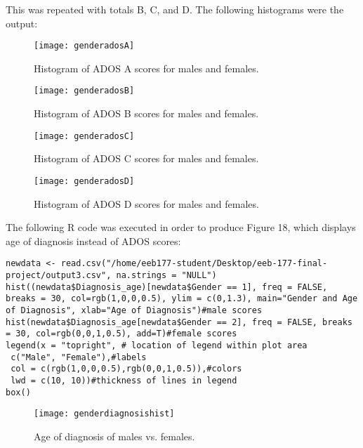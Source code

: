 \documentclass{article}
\begin{document}
This was repeated with totals B, C, and D. The following histograms were the output:
\begin{figure}[!htb]
  \centering
  \begin{minipage}[h!]{0.49\linewidth}
    \texttt{[image: genderadosA]}
    \caption{Histogram of ADOS A scores for males and females.}
  \end{minipage}
  \hfill
  \begin{minipage}[h!]{0.49\linewidth}
    \texttt{[image: genderadosB]}
    \caption{Histogram of ADOS B scores for males and females.}
  \end{minipage}
\end{figure}

\begin{figure}[!htb]
  \centering
  \begin{minipage}[h!]{0.49\linewidth}
    \texttt{[image: genderadosC]}
    \caption{Histogram of ADOS C scores for males and females.}
  \end{minipage}
  \hfill
  \begin{minipage}[h!]{0.49\linewidth}
    \texttt{[image: genderadosD]}
    \caption{Histogram of ADOS D scores for males and females.}
  \end{minipage}
\end{figure}

\newpage

The following R code was executed in order to produce Figure 18, which displays age of diagnosis instead of ADOS scores:

\begin{verbatim}
newdata <- read.csv("/home/eeb177-student/Desktop/eeb-177-final-project/output3.csv", na.strings = "NULL")
hist((newdata$Diagnosis_age)[newdata$Gender == 1], freq = FALSE, breaks = 30, col=rgb(1,0,0,0.5), ylim = c(0,1.3), main="Gender and Age of Diagnosis", xlab="Age of Diagnosis")#male scores
hist(newdata$Diagnosis_age[newdata$Gender == 2], freq = FALSE, breaks = 30, col=rgb(0,0,1,0.5), add=T)#female scores
legend(x = "topright", # location of legend within plot area
 c("Male", "Female"),#labels
 col = c(rgb(1,0,0,0.5),rgb(0,0,1,0.5)),#colors
 lwd = c(10, 10))#thickness of lines in legend
box()
\end{verbatim}

\begin{figure}[!htb]
  \centering
  \begin{minipage}[h!]{\linewidth}
    \texttt{[image: genderdiagnosishist]}
    \caption{Age of diagnosis of males vs. females.}
  \end{minipage}
\end{figure}
\end{document}
